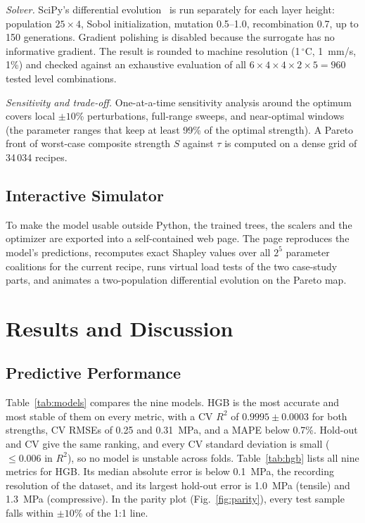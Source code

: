 \documentclass[conference,12pt]{IEEEtran}
\newcommand{\degC}{\ensuremath{^{\circ}}C}
\begin{document}
\textit{Solver.} SciPy's differential evolution~\cite{storn1997,virtanen2020} is run separately for each layer height: population $25 \times 4$, Sobol initialization, mutation 0.5--1.0, recombination 0.7, up to 150 generations. Gradient polishing is disabled because the surrogate has no informative gradient. The result is rounded to machine resolution (1\,\degC, 1~mm/s, 1\%) and checked against an exhaustive evaluation of all $6 \times 4 \times 4 \times 2 \times 5 = 960$ tested level combinations.

\textit{Sensitivity and trade-off.} One-at-a-time sensitivity analysis around the optimum covers local $\pm 10$\% perturbations, full-range sweeps, and near-optimal windows (the parameter ranges that keep at least 99\% of the optimal strength). A Pareto front of worst-case composite strength $S$ against $\tau$ is computed on a dense grid of 34\,034 recipes.

\subsection{Interactive Simulator}
To make the model usable outside Python, the trained trees, the scalers and the optimizer are exported into a self-contained web page. The page reproduces the model's predictions, recomputes exact Shapley values over all $2^5$ parameter coalitions for the current recipe, runs virtual load tests of the two case-study parts, and animates a two-population differential evolution on the Pareto map.

\section{Results and Discussion}
\label{sec:results}

\subsection{Predictive Performance}
Table~\ref{tab:models} compares the nine models. HGB is the most accurate and most stable of them on every metric, with a CV $R^2$ of $0.9995 \pm 0.0003$ for both strengths, CV RMSEs of 0.25 and 0.31~MPa, and a MAPE below 0.7\%. Hold-out and CV give the same ranking, and every CV standard deviation is small ($\leq 0.006$ in $R^2$), so no model is unstable across folds. Table~\ref{tab:hgb} lists all nine metrics for HGB. Its median absolute error is below 0.1~MPa, the recording resolution of the dataset, and its largest hold-out error is 1.0~MPa (tensile) and 1.3~MPa (compressive). In the parity plot (Fig.~\ref{fig:parity}), every test sample falls within $\pm 10$\% of the 1:1 line.
\end{document}
